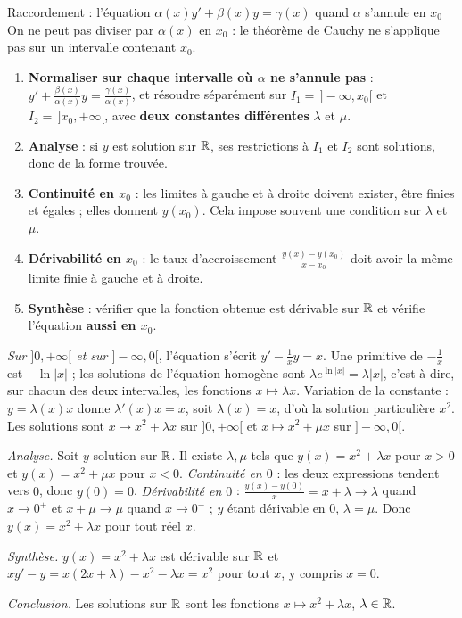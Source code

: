 \documentclass[a4paper,10pt]{article}
\begin{document}
\begin{METH}{Raccordement : l'équation $\alpha(x)y'+\beta(x)y=\gamma(x)$ quand $\alpha$ s'annule en $x_0$}
On ne peut pas diviser par $\alpha(x)$ en $x_0$ : le théorème de Cauchy ne s'applique pas sur un intervalle contenant $x_0$.
\begin{enumerate}
\item \textbf{Normaliser sur chaque intervalle où $\alpha$ ne s'annule pas} : $y'+\frac{\beta(x)}{\alpha(x)}y=\frac{\gamma(x)}{\alpha(x)}$, et résoudre
séparément sur $I_1=\,]-\infty,x_0[$ et $I_2=\,]x_0,+\infty[$, avec \textbf{deux constantes différentes} $\lambda$ et $\mu$.
\item \textbf{Analyse} : si $y$ est solution sur $\R$, ses restrictions à $I_1$ et $I_2$ sont solutions, donc de la forme trouvée.
\item \textbf{Continuité en $x_0$} : les limites à gauche et à droite doivent exister, être finies et égales ; elles donnent $y(x_0)$. Cela impose
souvent une condition sur $\lambda$ et $\mu$.
\item \textbf{Dérivabilité en $x_0$} : le taux d'accroissement $\frac{y(x)-y(x_0)}{x-x_0}$ doit avoir la même limite finie à gauche et à droite.
\item \textbf{Synthèse} : vérifier que la fonction obtenue est dérivable sur $\R$ et vérifie l'équation \textbf{aussi en $x_0$}.
\end{enumerate}
\end{METH}

\begin{REDAC}[RÉSOUDRE $xy'-y=x^2$ SUR $\R$]
\emph{Sur $]0,+\infty[$ et sur $]-\infty,0[$}, l'équation s'écrit $y'-\frac1xy=x$. Une primitive de $-\frac1x$ est $-\ln|x|$ ; les solutions de
l'équation homogène sont $\lambda e^{\ln|x|}=\lambda|x|$, c'est-à-dire, sur chacun des deux intervalles, les fonctions $x\mapsto\lambda x$. Variation de la
constante : $y=\lambda(x)x$ donne $\lambda'(x)x=x$, soit $\lambda(x)=x$, d'où la solution particulière $x^2$. Les solutions sont $x\mapsto x^2+\lambda x$
sur $]0,+\infty[$ et $x\mapsto x^2+\mu x$ sur $]-\infty,0[$.

\emph{Analyse.} Soit $y$ solution sur $\R$. Il existe $\lambda,\mu$ tels que $y(x)=x^2+\lambda x$ pour $x>0$ et $y(x)=x^2+\mu x$ pour $x<0$.
\emph{Continuité en $0$} : les deux expressions tendent vers $0$, donc $y(0)=0$. \emph{Dérivabilité en $0$} : $\frac{y(x)-y(0)}x=x+\lambda\to\lambda$
quand $x\to0^+$ et $x+\mu\to\mu$ quand $x\to0^-$ ; $y$ étant dérivable en $0$, $\lambda=\mu$. Donc $y(x)=x^2+\lambda x$ pour tout réel $x$.

\emph{Synthèse.} $y(x)=x^2+\lambda x$ est dérivable sur $\R$ et $xy'-y=x(2x+\lambda)-x^2-\lambda x=x^2$ pour tout $x$, y compris $x=0$.

\emph{Conclusion.} Les solutions sur $\R$ sont les fonctions $x\mapsto x^2+\lambda x$, $\lambda\in\mathbb{R}$.
\end{REDAC}
\end{document}
